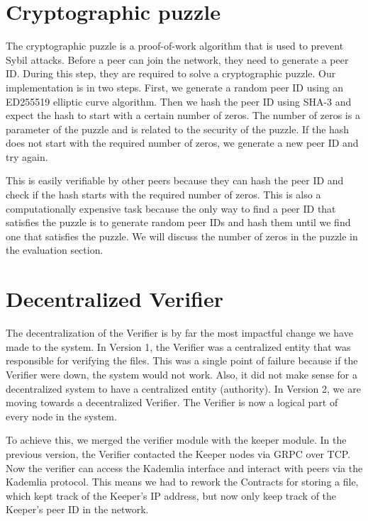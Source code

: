\section{Cryptographic puzzle}

The cryptographic puzzle is a proof-of-work algorithm that is used to prevent Sybil attacks.
Before a peer can join the network, they need to generate a peer ID.
During this step, they are required to solve a cryptographic puzzle.
Our implementation is in two steps.
First, we generate a random peer ID using an ED255519 elliptic curve algorithm.
Then we hash the peer ID using SHA-3 and expect the hash to start with a certain number of zeros.
The number of zeros is a parameter of the puzzle and is related to the security of the puzzle.
If the hash does not start with the required number of zeros, we generate a new peer ID and try again.

This is easily verifiable by other peers because they can hash the peer ID and check if the hash starts with the required number of zeros.
This is also a computationally expensive task because the only way to find a peer ID that satisfies the puzzle is to generate random peer IDs and hash them until we find one that satisfies the puzzle.
We will discuss the number of zeros in the puzzle in the evaluation section.

\section{Decentralized Verifier}

The decentralization of the Verifier is by far the most impactful change we have made to the system.
In Version 1, the Verifier was a centralized entity that was responsible for verifying the files.
This was a single point of failure because if the Verifier were down, the system would not work.
Also, it did not make sense for a decentralized system to have a centralized entity (authority).
In Version 2, we are moving towards a decentralized Verifier.
The Verifier is now a logical part of every node in the system.

To achieve this, we merged the verifier module with the keeper module.
In the previous version, the Verifier contacted the Keeper nodes via GRPC over TCP.
Now the verifier can access the Kademlia interface and interact with peers via the Kademlia protocol.
This means we had to rework the Contracts for storing a file, which kept track of the Keeper's IP address,
but now only keep track of the Keeper's peer ID in the network.

